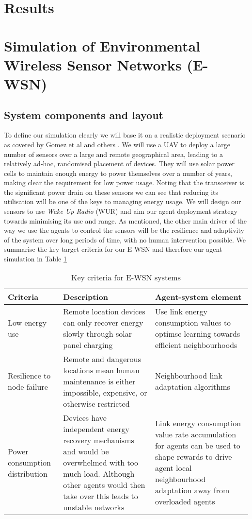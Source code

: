 	\section{Results}
	
	\section{Simulation of Environmental Wireless Sensor Networks (E-WSN)}
	
	\subsection{System components and layout}
	
	To define our simulation clearly we will base it on a realistic deployment scenario as covered by Gomez et al \cite{Gomez} and others \cite{Jha2016, Avram}. We will use a UAV to deploy a large number of sensors over a large and remote geographical area, leading to a relatively ad-hoc, randomised placement of devices. They will use solar power cells to maintain enough energy to power themselves over a number of years, making clear the requirement for low power usage. Noting that the transceiver is the significant power drain on these sensors we can see that reducing its utilisation will be one of the keys to managing energy usage. We will design our sensors to use \textit{Wake Up Radio} (WUR) and aim our agent deployment strategy towards minimising its use and range. As mentioned, the other main driver of the way we use the agents to control the sensors will be the resilience and adaptivity of the system over long periods of time, with no human intervention possible.  We summarise the key target criteria for our E-WSN and therefore our agent simulation in Table \ref {table:real_world_systems_criteria} 
	\begin{table}
		\begin{tabular}{p{}p{} p{}}
			\hline
			\textbf{Criteria} & \textbf{Description} & \textbf{Agent-system element} \\
			\hline
			Low energy use & Remote location devices can only recover energy slowly through solar panel charging &  Use link energy consumption values to optimse learning towards efficient neighbourhoods \\
			Resilience to node failure & Remote and dangerous locations mean human maintenance is either impossible, expensive, or otherwise restricted & Neighbourhood link adaptation algorithms \\	
			Power consumption distribution & Devices have independent energy recovery mechanisms and would be overwhelmed with too much load. Although other agents would then take over this leads to unstable networks & Link energy consumption value rate accumulation for agents can be used to shape rewards to drive agent local neighbourhood adaptation away from overloaded agents  \\ 
			\hline
		\end{tabular}
		\caption{Key criteria for E-WSN systems}
		\label{table:real_world_systems_criteria}
	\end{table}
	
